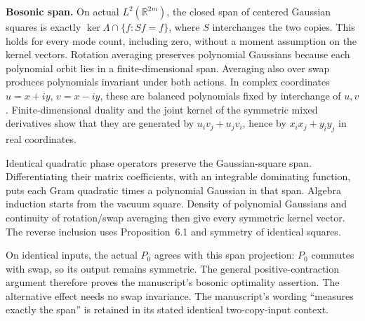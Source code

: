\begin{theorem}
  \textbf{Bosonic span.} On actual $L^2(\mathbb R^{2m})$, the closed span of
  centered Gaussian squares is exactly
  $\ker\Lambda\cap\{f:Sf=f\}$, where $S$ interchanges the two copies.
  This holds for every mode count, including zero, without a moment
  assumption on the kernel vectors. Rotation averaging preserves polynomial
  Gaussians because each polynomial orbit lies in a finite-dimensional span.
  Averaging also over swap produces polynomials invariant under both actions.
  In complex coordinates $u=x+iy$, $v=x-iy$, these are balanced polynomials
  fixed by interchange of $u,v$. Finite-dimensional duality and the joint
  kernel of the symmetric mixed derivatives show that they are generated by
  $u_i v_j+u_j v_i$, hence by $x_i x_j+y_i y_j$ in real coordinates.

  Identical quadratic phase operators preserve the Gaussian-square span.
  Differentiating their matrix coefficients, with an integrable dominating
  function, puts each Gram quadratic times a polynomial Gaussian in that
  span. Algebra induction starts from the vacuum square. Density of
  polynomial Gaussians and continuity of rotation/swap averaging then give
  every symmetric kernel vector. The reverse inclusion uses
  Proposition~6.1 and symmetry of identical squares.

  On identical inputs, the actual $P_0$ agrees with this span projection:
  $P_0$ commutes with swap, so its output remains symmetric. The general
  positive-contraction argument therefore proves the manuscript's bosonic
  optimality assertion. The alternative effect needs no swap invariance.
  The manuscript's wording ``measures exactly the span'' is retained in
  its stated identical two-copy-input context.
\end{theorem}

